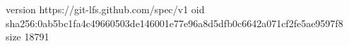 version https://git-lfs.github.com/spec/v1
oid sha256:0ab5bc1fa4c49660503de146001e77e96a8d5dfb0c6642a071cf2fe5ae9597f8
size 18791
